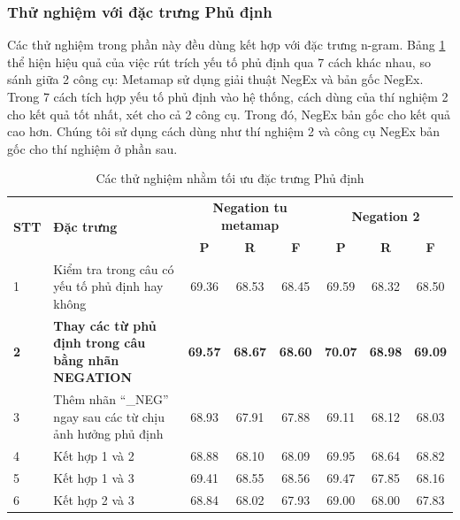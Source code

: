 \subsubsection*{Thử nghiệm với đặc trưng Phủ định}
Các thử nghiệm trong phần này đều dùng kết hợp với đặc trưng n-gram. Bảng \ref{table:negation} thể hiện hiệu quả của việc rút trích yếu tố phủ định qua 7 cách khác nhau, so sánh giữa 2 công cụ: Metamap sử dụng giải thuật NegEx và bản gốc NegEx. Trong 7 cách tích hợp yếu tố phủ định vào hệ thống, cách dùng của thí nghiệm 2 cho kết quả tốt nhất, xét cho cả 2 công cụ. Trong đó, NegEx bản gốc cho kết quả cao hơn. Chúng tôi sử dụng cách dùng như thí nghiệm 2 và công cụ NegEx bản gốc cho thí nghiệm ở phần sau.
\begin{table}[H]
\centering
\begin{minipage}{1\textwidth}
\caption{Các thử nghiệm nhằm tối ưu đặc trưng Phủ định} \label{table:negation}
\begin{tabular}{|l|m{}|ccc|ccc|}
\hline
\multirow{2}{*}{\textbf{STT}} & \multirow{2}{*}{\textbf{Đặc trưng}} & \multicolumn{3}{c|}{\textbf{Negation tu metamap}} & \multicolumn{3}{c|}{\textbf{Negation 2}}  \\ \cline{3-8}
                     &                            & \textbf{P}           & \textbf{R}           & \textbf{F}           & \textbf{P}        & \textbf{R}        & \textbf{F}        \\
\hline
1 & Kiểm tra trong câu có yếu tố phủ định hay không& 69.36 & 68.53 & 68.45 &
69.59 & 68.32 & 68.50 \\ \hline

\textbf{2} & \textbf{Thay các từ phủ định trong câu bằng nhãn NEGATION} & \textbf{69.57} & \textbf{68.67} & \textbf{68.60} & 
\textbf{70.07} & \textbf{68.98} & \textbf{69.09} \\ \hline

3 & Thêm nhãn ``\_NEG'' ngay sau các từ chịu ảnh hưởng phủ định & 68.93 & 67.91 & 67.88 &
69.11 & 68.12 & 68.03 \\ \hline

4 & Kết hợp 1 và 2 & 68.88 & 68.10 & 68.09 &
69.95 & 68.64 & 68.82 \\ \hline

5 & Kết hợp 1 và 3 & 69.41 & 68.55  & 68.56 &
69.47 & 67.85 & 68.16 \\ \hline

6 & Kết hợp 2 và 3 & 68.84 & 68.02 & 67.93 &
69.00 & 68.00 & 67.83 \\ \hline


\end{tabular}
\end{minipage}
\end{table}
